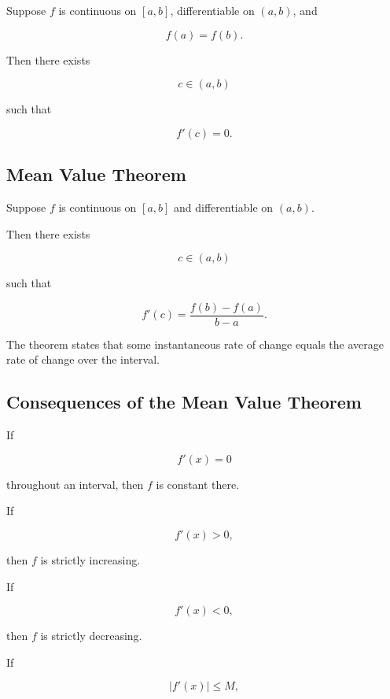\begin{theorem}
Suppose \(f\) is continuous on \([a,b]\), differentiable on \((a,b)\), and

\[
f(a)=f(b).
\]

Then there exists

\[
c\in(a,b)
\]

such that

\[
\boxed{
f'(c)=0.
}
\]
\end{theorem}

\subsection{Mean Value Theorem}
\label{subsec:mean-value-theorem-analysis}

\begin{theorem}
Suppose \(f\) is continuous on \([a,b]\) and differentiable on \((a,b)\).

Then there exists

\[
c\in(a,b)
\]

such that

\[
\boxed{
f'(c)
=
\frac{f(b)-f(a)}{b-a}.
}
\]
\end{theorem}

The theorem states that some instantaneous rate of change equals the
average rate of change over the interval.

\subsection{Consequences of the Mean Value Theorem}
\label{subsec:mvt-consequences}

If

\[
f'(x)=0
\]

throughout an interval, then \(f\) is constant there.

If

\[
f'(x)>0,
\]

then \(f\) is strictly increasing.

If

\[
f'(x)<0,
\]

then \(f\) is strictly decreasing.

If

\[
|f'(x)|\leq M,
\]

